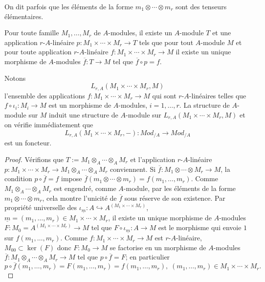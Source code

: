 \begin{definition}
  On dit parfois que les éléments de la forme $m_1\otimes\dotsb\otimes m_r$ sont des tenseurs élémentaires.
\end{definition}

\begin{lemme}\label{PTUniv}
  Pour toute famille $M_1 ,\dots, M_r$ de $A$-modules, il existe un
  $A$-module $T$ et une application $r$-$A$-linéaire
  $p:M_1\times\cdots\times M_r\rightarrow T$ tels que pour tout
  $A$-module $M$ et pour toute application $r$-$A$-linéaire
  $f:M_1\times\cdots\times M_r\rightarrow M$ il existe un unique
  morphisme de $A$-modules $\overline{f}:T\rightarrow M$ tel que
  $\overline{f}\circ p=f$.
\end{lemme}

\begin{remarque}
  Notons $$L_{r,A}(M_1\times\cdots\times M_r,M)$$ l'ensemble des
  applications $f:M_1\times\cdots\times M_r\rightarrow M$ qui
  sont $r$-$A$-linéaires \ie{} telles que
  $f\circ \iota_{i}:M_{i}\rightarrow M$ est un morphisme de
  $A$-modules, $i=1,\dots,r$. La structure de $A$-module sur $M$
  induit une structure de $A$-module sur
  $L_{r,A}(M_1\times\cdots\times M_r,M)$ et on vérifie
  immédiatement que
  $$L_{r,A}(M_1\times\cdots\times M_r,-):Mod_{/A}\rightarrow Mod_{/A}$$
  est un foncteur.
\end{remarque}

\begin{proof}Vérifions  que $T:=M_1\otimes_{A}\cdots \otimes_{A} M_r$ et  l'application $r$-$A$-linéaire $p:M_1\times\cdots\times M_r\rightarrow M_1\otimes_{A}\cdots \otimes_{A} M_r$ conviennent. Si $\overline{f}:M_1\otimes\cdots \otimes M_r\rightarrow M$, la condition $p\circ \overline{f}=f$ impose $\overline{f}(m_1\otimes\cdots\otimes m_r)=f(m_1,\dots, m_r)$. Comme $M_1\otimes_{A}\cdots \otimes_{A} M_r$  est engendré, comme $A$-module, par les éléments de la forme $m_1\otimes\cdots\otimes m_r$, cela montre l'unicité de $\overline{f}$ sous réserve de son existence. Par propriété universelle des $\iota_{\underline{m}}:A\hookrightarrow A^{(M_1\times\cdots\times M_r)}$, $\underline{m}=(m_1,\dots, m_r)\in M_1\times\cdots\times M_r$, il existe un unique morphisme de $A$-modules $F:M_{0}=A^{(M_1\times\cdots\times M_r)}\rightarrow M$ tel que $F\circ \iota_{\underline{m}}:A\rightarrow M$ est le morphisme qui envoie $1$ sur $f(m_1,\dots, m_r)$. Comme $f:M_1\times\cdots\times M_r\rightarrow M$ est $r$-$A$-linéaire,  $M_{00}\subset \ker(F)$ donc $F:M_{0} \rightarrow M $ se factorise en un morphisme de $A$-modules $\overline{f}:M_1\otimes_{A} \cdots\otimes_{A} M_r\rightarrow M$ tel que $p\circ \overline{f}=F$; en particulier  $$p\circ \overline{f}(m_1,\dots,m_r)=F(m_1,\dots, m_r)=f(m_1,\dots, m_r),\; (m_1,\dots, m_r)\in M_1\times\cdots\times M_r.$$
\end{proof}

